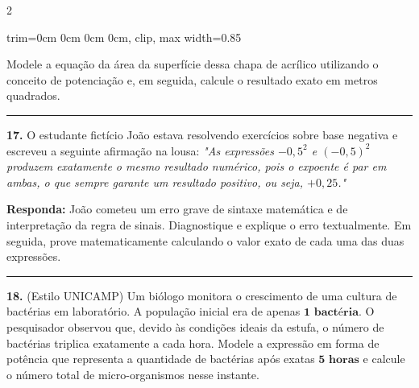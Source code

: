 \documentclass[twoside, 10pt, a4paper]{article}
\newlength{\espacoPreQuestao}\setlength{\espacoPreQuestao}{0.1cm}
\newlength{\espacoQuestao}\setlength{\espacoQuestao}{0.2cm}
\newcommand{\larguraTikz}{0.85\linewidth}
\begin{document}
\begin{multicols*}{2}
\begin{center}
\begin{adjustbox}{trim=0cm 0cm 0cm 0cm, clip, max width=\larguraTikz}
\end{adjustbox}
\end{center}
Modele a equação da área da superfície dessa chapa de acrílico utilizando o conceito de potenciação e, em seguida, calcule o resultado exato em metros quadrados.
\par\vspace{\espacoQuestao}

\noindent\textcolor{CorLinha}{\rule{\linewidth}{0.5pt}} 
\par\vspace{\espacoPreQuestao}
\textbf{17.} O estudante fictício João estava resolvendo exercícios sobre base negativa e escreveu a seguinte afirmação na lousa: 
\textit{"As expressões $ -0,5^{2} $ e $ (-0,5)^{2} $ produzem exatamente o mesmo resultado numérico, pois o expoente é par em ambas, o que sempre garante um resultado positivo, ou seja, $ +0,25 $."}
\begin{boxresponda}
\textbf{Responda:} João cometeu um erro grave de sintaxe matemática e de interpretação da regra de sinais. Diagnostique e explique o erro textualmente. Em seguida, prove matematicamente calculando o valor exato de cada uma das duas expressões.
\end{boxresponda}
\par\vspace{\espacoQuestao}

\noindent\textcolor{CorLinha}{\rule{\linewidth}{0.5pt}} 
\par\vspace{\espacoPreQuestao}
\textbf{18.} (Estilo UNICAMP) Um biólogo monitora o crescimento de uma cultura de bactérias em laboratório. A população inicial era de apenas $ \textbf{1 bactéria} $. O pesquisador observou que, devido às condições ideais da estufa, o número de bactérias triplica exatamente a cada hora. Modele a expressão em forma de potência que representa a quantidade de bactérias após exatas $ \textbf{5 horas} $ e calcule o número total de micro-organismos nesse instante.
\par\vspace{\espacoQuestao}


\end{multicols*}
\end{document}
